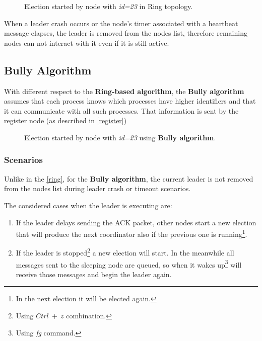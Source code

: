 \documentclass[conference]{IEEEtran}
\begin{document}
\begin{figure}[htbp]
  \centering
  
  \caption{Election started by node with \textit{id=23} in Ring topology.}
\end{figure}

When a leader crash occurs or the node's timer associated with a heartbeat message elapses, the leader is removed from the nodes list, therefore remaining nodes can not interact with it even if it is still active.  

\subsection{Bully Algorithm}

With different respect to the \textbf{Ring-based algorithm}, the \textbf{Bully algorithm} assumes that each process knows which processes have higher identifiers and that it can communicate with all such processes. That information is sent by the register node (as described in \ref{register}) 

\begin{figure}[htbp]
  \centering
  
  \caption{Election started by node with \textit{id=23} using \textbf{Bully algorithm}.}
\end{figure}

\subsubsection{Scenarios}

Unlike in the \ref{ring}, for the \textbf{Bully algorithm}, the current leader is not removed from the nodes list during leader crash or timeout scenarios.

The considered cases when the leader is executing are:  

\begin{enumerate}
    \item If the leader delays sending the ACK packet, other nodes start a new election that will produce the next coordinator also if the previous one is running\footnote{In the next election it will be elected again.}.
    \item If the leader is stopped\footnote{Using $Ctrl\ +\ z$ combination.} a new election will start. In the meanwhile all messages sent to the sleeping node are queued, so when it wakes up\footnote{Using \textit{fg} command.} will receive those messages and begin the leader again.
\end{enumerate}
\end{document}
